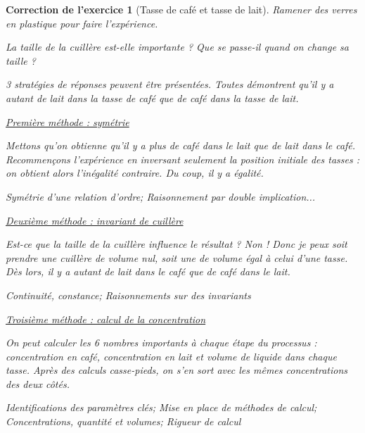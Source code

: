 \documentclass[12pt]{article}
\theoremstyle{break}
\newtheorem{cor}{Correction de l'exercice}
\begin{document}
\begin{cor}[Tasse de café et tasse de lait]
\textit{Ramener des verres en plastique pour faire l'expérience.}

\textit{La taille de la cuillère est-elle importante ? Que se passe-il quand on change sa taille ?}

3 stratégies de réponses peuvent être présentées. Toutes démontrent qu'il y a autant de lait dans la tasse de café que de café dans la tasse de lait.
\newline \newline


\underline{Première méthode : symétrie}

Mettons qu'on obtienne qu'il y a plus de café dans le lait que de lait dans le café. Recommençons l'expérience en inversant seulement la position initiale des tasses : on obtient alors l'inégalité contraire. Du coup, il y a égalité.\newline



\textit{Symétrie d'une relation d'ordre; Raisonnement par double implication...}
\newline

\underline{Deuxième méthode : invariant de cuillère}

Est-ce que la taille de la cuillère influence le résultat ? Non ! Donc je peux soit prendre une cuillère de volume nul, soit une de volume égal à celui d'une tasse. Dès lors, il y a autant de lait dans le café que de café dans le lait.

\textit{Continuité, constance; Raisonnements sur des invariants}
\newline

\underline{Troisième méthode : calcul de la concentration}

On peut calculer les 6 nombres importants à chaque étape du processus : concentration en café, concentration en lait et volume de liquide dans chaque tasse. Après des calculs casse-pieds, on s'en sort avec les mêmes concentrations des deux côtés.

\textit{Identifications des paramètres clés; Mise en place de méthodes de calcul; Concentrations, quantité et volumes; Rigueur de calcul}
\end{cor}
\end{document}
